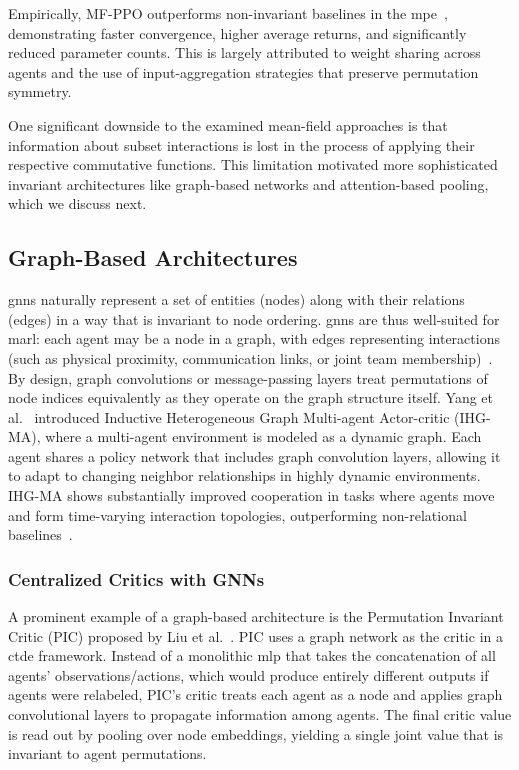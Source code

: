 \documentclass{article}
\begin{document}
Empirically, MF-PPO outperforms non-invariant baselines in the 
\gls{mpe}~\cite{li2021b}, demonstrating faster convergence, 
higher average returns, and significantly reduced parameter counts. 
This is largely attributed to weight sharing across agents and the 
use of input-aggregation strategies that preserve permutation symmetry. 

One significant downside to the examined mean-field approaches is that 
information about subset interactions is lost in the process of 
applying their respective commutative functions.
This limitation motivated more sophisticated invariant architectures like 
graph-based networks and attention-based pooling, which we discuss next.


\subsection{Graph-Based Architectures}

\Glspl{gnn} naturally represent a set of entities (nodes) along with 
their relations (edges) in a way that is invariant to node ordering. 
\Glspl{gnn} are thus well-suited for \gls{marl}: each agent may be a node in a graph, 
with edges representing interactions (such as physical proximity, 
communication links, or joint team membership)~\cite{liu2020b}. 
By design, graph convolutions or message-passing layers treat permutations of 
node indices equivalently as they operate on the graph structure itself. 
Yang et al.~\cite{yang2021a} introduced Inductive Heterogeneous Graph Multi-agent 
Actor-critic (IHG-MA), where a multi-agent environment is modeled as a dynamic graph. 
Each agent shares a policy network that includes graph convolution layers, 
allowing it to adapt to changing neighbor relationships in highly dynamic environments. 
IHG-MA shows substantially improved cooperation in tasks where agents move and form time-varying 
interaction topologies, outperforming non-relational baselines~\cite{yang2021a}. 

\subsubsection{Centralized Critics with GNNs}
A prominent example of a graph-based architecture is the Permutation 
Invariant Critic (PIC) proposed by Liu et al.~\cite{liu2020b}. 
PIC uses a graph network as the critic in a \gls{ctde} framework. 
Instead of a monolithic \gls{mlp} that takes the concatenation of 
all agents' observations/actions, which would produce entirely different 
outputs if agents were relabeled, PIC's critic treats each agent as a node 
and applies graph convolutional layers to propagate information among agents. 
The final critic value is read out by pooling over node embeddings, 
yielding a single joint value that is invariant to agent permutations. 
\end{document}
